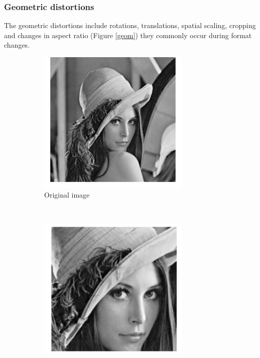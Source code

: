 \subsubsection{Geometric distortions}
The geometric distortions include rotations, translations, spatial scaling, cropping and changes in aspect ratio (Figure \ref{geom}) they commonly occur during format changes.

\begin{figure}[h!]
\centering
\begin{subfigure}[]{0.4\textwidth}
\centering
\includegraphics[width=0.8\textwidth]{./img/lena3.png}
\caption{\small{Original image}}
\label{fig:geom1}
\end{subfigure}%
~ %
\begin{subfigure}[]{0.4\textwidth}
\centering
\includegraphics[width= 0.8\textwidth]{./img/crop.png}

\end{subfigure}
\end{figure}
